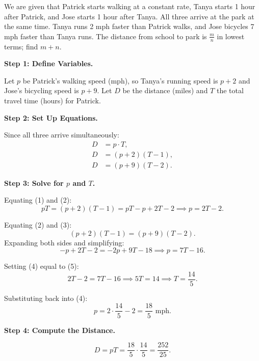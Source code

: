 \documentclass{article}
\begin{document}
\begin{tcolorbox}[title=The early training stage model (unscaled), breakable]

We are given that Patrick starts walking at a constant rate, Tanya starts 1 hour after Patrick, and Jose starts 1 hour after Tanya. All three arrive at the park at the same   
time. Tanya runs 2 mph faster than Patrick walks, and Jose bicycles 7 mph faster than Tanya runs. The distance from school to park is $\tfrac{m}{n}$ in lowest terms; find
$m+n$.                                                                                                                                                                         
              
\medskip
\textbf{Step 1: Define Variables.}

Let $p$ be Patrick's walking speed (mph), so Tanya's running speed is $p+2$ and Jose's bicycling speed is $p+9$. Let $D$ be the distance (miles) and $T$ the total travel time
(hours) for Patrick.

\medskip
\textbf{Step 2: Set Up Equations.}

Since all three arrive simultaneously:
\begin{align}
D &= p \cdot T, \tag{1}\\
D &= (p+2)(T-1), \tag{2}\\
D &= (p+9)(T-2). \tag{3}
\end{align}

\medskip
\textbf{Step 3: Solve for $p$ and $T$.}

Equating (1) and (2):
\[
pT = (p+2)(T-1) = pT - p + 2T - 2
\implies p = 2T - 2. \tag{4}
\]

Equating (2) and (3):
\[
(p+2)(T-1) = (p+9)(T-2).
\]
Expanding both sides and simplifying:
\[
-p + 2T - 2 = -2p + 9T - 18
\implies p = 7T - 16. \tag{5}
\]

Setting (4) equal to (5):
\[
2T - 2 = 7T - 16 \implies 5T = 14 \implies T = \frac{14}{5}.
\]                                                                                                                                                                             

Substituting back into (4):                                                                                                                                                    
\[              
p = 2\cdot\frac{14}{5} - 2 = \frac{18}{5} \text{ mph}.
\]

\medskip
\textbf{Step 4: Compute the Distance.}

\[
D = pT = \frac{18}{5} \cdot \frac{14}{5} = \frac{252}{25}.
\]


\end{tcolorbox}
\end{document}
